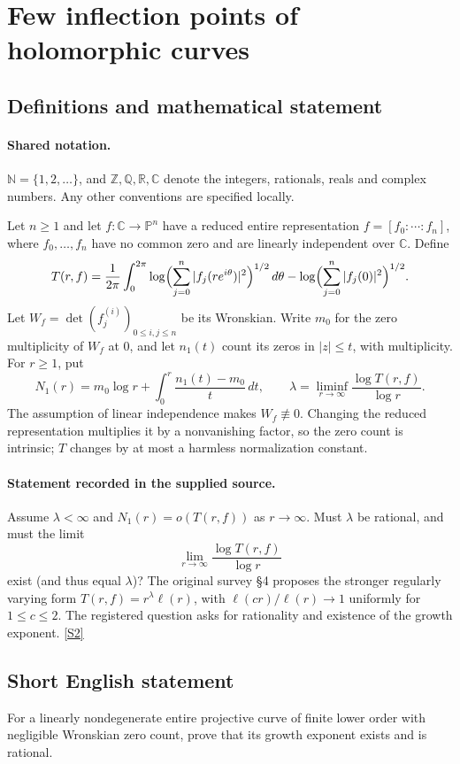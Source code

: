 \documentclass[11pt]{article}
\newcommand{\sref}[2]{\hyperlink{source:#1:#2}{[S#2]}}
\begin{document}
\section{Few inflection points of holomorphic curves}\label{statement}

\subsection{Definitions and mathematical statement}

\paragraph{Shared notation.}$\mathbb N=\{1,2,\ldots\}$, and $\mathbb Z,\mathbb Q,\mathbb R,\mathbb C$ denote the integers, rationals, reals and complex numbers. Any other conventions are specified locally.


Let $n\ge1$ and let $f:\mathbb C\to\mathbb P^n$ have a reduced entire representation $f=[f_0:\cdots:f_n]$, where $f_0,\ldots,f_n$ have no common zero and are linearly independent over $\mathbb C$. Define
\[
 T(r,f)=\frac{1}{2\pi}\int_0^{2\pi}\log\Bigl(\sum_{j=0}^{n}|f_j(re^{i\theta})|^2\Bigr)^{1/2}\,d\theta
 -\log\Bigl(\sum_{j=0}^{n}|f_j(0)|^2\Bigr)^{1/2}.
\]
Let $W_f=\det(f_j^{(i)})_{0\le i,j\le n}$ be its Wronskian. Write $m_0$ for the zero multiplicity of $W_f$ at $0$, and let $n_1(t)$ count its zeros in $|z|\le t$, with multiplicity. For $r\ge1$, put
\[
 N_1(r)=m_0\log r+\int_0^r\frac{n_1(t)-m_0}{t}\,dt,
 \qquad\lambda=\liminf_{r\to\infty}\frac{\log T(r,f)}{\log r}.
\]
The assumption of linear independence makes $W_f\not\equiv0$. Changing the reduced representation multiplies it by a nonvanishing factor, so the zero count is intrinsic; $T$ changes by at most a harmless normalization constant.
\paragraph{Statement recorded in the supplied source.}
Assume $\lambda<\infty$ and $N_1(r)=o(T(r,f))$ as $r\to\infty$. Must $\lambda$ be rational, and must the limit
\[
 \lim_{r\to\infty}\frac{\log T(r,f)}{\log r}
\]
exist (and thus equal $\lambda$)? The original survey §4 proposes the stronger regularly varying form $T(r,f)=r^\lambda\ell(r)$, with $\ell(cr)/\ell(r)\to1$ uniformly for $1\le c\le2$. The registered question asks for rationality and existence of the growth exponent. \sref{statement}{2}
\subsection{Short English statement}
For a linearly nondegenerate entire projective curve of finite lower order with negligible Wronskian zero count, prove that its growth exponent exists and is rational.
\end{document}
